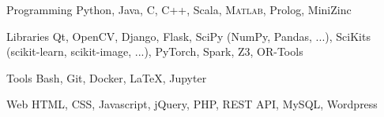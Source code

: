 

\begin{minipage}[]{0.4\textwidth}
  \vspace{2.0mm}

  \begin{cvskills}
    \cvskill
      {Programming}
      {Python, Java, C, C++, Scala, \textsc{Matlab}, Prolog, MiniZinc}

    \cvskill
      {Libraries}
      {Qt, OpenCV, Django, Flask, SciPy (NumPy, Pandas, ...), SciKits (scikit-learn, scikit-image, ...), PyTorch, Spark, Z3, OR-Tools}

    \cvskill
      {Tools}
      {Bash, Git, Docker, \LaTeX, Jupyter}

    \cvskill
      {Web}
      {HTML, CSS, Javascript, jQuery, PHP, REST API, MySQL, Wordpress}
  \end{cvskills}
\end{minipage}%
\begin{minipage}[]{0.6\textwidth}
  \hfill
\end{minipage}
\vspace{-2.0mm}


